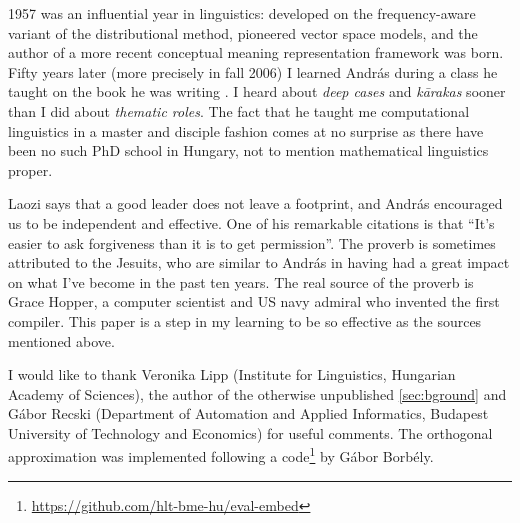 \documentclass[11pt]{article}
\begin{document}
1957 was an influential year in linguistics: \cite{Harris:1957} developed on the
frequency-aware variant of the distributional method, \cite{Osgood:1957}
pioneered vector space models, and the author of a more recent conceptual
meaning representation framework \citep{Kornai:2010,Kornai:2017} was born.
Fifty years later (more precisely in fall 2006) I learned András during a class
he taught on the book he was writing \citep{Kornai:2007}. I heard about
\emph{deep cases} and \emph{k\={a}rakas} sooner than I did about \emph{thematic
roles}. The fact that he taught me computational linguistics in a master and
disciple fashion comes at no surprise as there have been no such PhD school in
Hungary, not to mention mathematical linguistics proper.

Laozi says that a good leader does not leave a footprint, and András encouraged
us to be independent and effective. One of his remarkable citations is that
``It's easier to ask forgiveness than it is to get permission''. The proverb is
sometimes attributed to the Jesuits, who are similar to András in having had a
great impact on what I've become in the past ten years. The real source of the
proverb is Grace Hopper, a computer scientist and US navy admiral who invented
the first compiler.
This paper is a step in my learning to be so effective as the sources
mentioned above.

\bigskip

I would like to thank Veronika Lipp (Institute for Linguistics, Hungarian
Academy of Sciences), the author of the otherwise unpublished
\cref{sec:bground} and Gábor Recski (Department of Automation and Applied
Informatics, Budapest University of Technology and Economics) for useful
comments. The orthogonal approximation was implemented following a
code\footnote{\url{https://github.com/hlt-bme-hu/eval-embed}} by Gábor Borbély.



\end{document}
